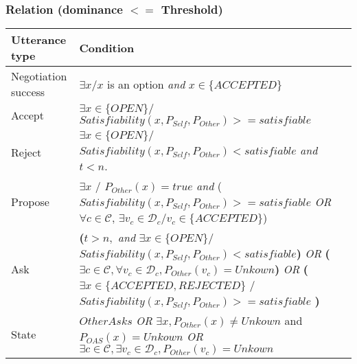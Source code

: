 \documentclass{article}
\begin{document}
	\subsubsection{Relation (\textbf{dominance $<=$ Threshold})}
	\begin{tabular}{|p{3cm}|p{9cm}|}
		\hline
		\textbf{Utterance type} & Condition \\
		\hline
		Negotiation success &  $\exists x/ x$ is an option \emph{and} $x \in \{ACCEPTED\}$ \\
		\hline
		Accept & $\exists x \in \{OPEN\} /$ \newline $Satisfiability(x, P_{Self}, P_{Other}) >= satisfiable$ \\
		\hline
		Reject & $\exists x \in \{OPEN\} /$ \newline $ Satisfiability(x, P_{Self}, P_{Other}) < satisfiable$  \emph{and} $t<n$.\\
		\hline
		Propose & $\exists x$ / $P_{Other} (x)= true $  \emph{and}
		\newline ($Satisfiability(x, P_{Self}, P_{Other}) >= satisfiable$
		\newline \emph{OR}  
		\newline $\forall c \in \mathcal{C}$, $\exists v_c \in \mathcal{D}_c / v_c \in \{ACCEPTED\}$)\\
		\hline
		Ask &  \textbf{(}$t>n,$ \emph{and} 
		\newline $\exists x \in \{OPEN\} /$
		\newline $ Satisfiability(x, P_{Self}, P_{Other}) < satisfiable $\textbf{) }
		\newline \emph{OR}
		\newline \textbf{(}$ \exists c \in \mathcal{C},  \forall v_c \in \mathcal{D}_c, P_{Other}(v_c) = Unkown$\textbf{)}
		\newline \emph{OR} 
		\newline \textbf{(}$\exists x \in \{ACCEPTED, REJECTED\}$ / 
		\newline $Satisfiability(x, P_{Self}, P_{Other}) >= satisfiable$ \textbf{)} \\
		\hline
		
		State & $OtherAsks$
		\newline \emph{OR}
		\newline $\exists x,P_{Other}(x) \not = Unkown $ and $P_{OAS}(x) = Unkown$ 
		\newline \emph{OR}
		\newline $ \exists c \in \mathcal{C}, \exists v_c \in \mathcal{D}_c, P_{Other}(v_c) = Unkown$
		\\
		\hline
	\end{tabular}
	
\end{document}
